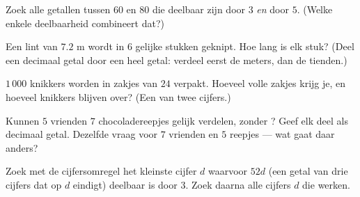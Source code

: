\begin{exercise}[$\star$]\label{exo:g5:division:7}
Zoek alle getallen tussen $60$ en $80$ die deelbaar zijn door $3$ \emph{en}
door $5$. (Welke enkele deelbaarheid combineert dat?)
\end{exercise}

\begin{exercise}[$\star$]\label{exo:g5:division:8}
Een lint van $7.2$ m wordt in $6$ gelijke stukken geknipt. Hoe lang is elk
stuk? (Deel een decimaal getal door een heel getal: verdeel eerst de meters,
dan de tienden.)
\end{exercise}

\begin{exercise}[$\star$]\label{exo:g5:division:9}
$1\,000$ knikkers worden in zakjes van $24$ verpakt. Hoeveel volle zakjes
krijg je, en hoeveel knikkers blijven over? (Een  van twee cijfers.)
\end{exercise}

\begin{exercise}[$\star\star$]\label{exo:g5:division:10}
Kunnen $5$ vrienden $7$ chocoladereepjes gelijk verdelen, zonder ? Geef
elk deel als decimaal getal. Dezelfde vraag voor $7$ vrienden en $5$
reepjes --- wat gaat daar anders?
\end{exercise}

\begin{exercise}[$\star\star$]\label{exo:g5:division:11}
Zoek met de cijfersomregel het kleinste cijfer $d$ waarvoor $52d$ (een getal
van drie cijfers dat op $d$ eindigt) deelbaar is door $3$. Zoek daarna alle
cijfers $d$ die werken.
\end{exercise}
